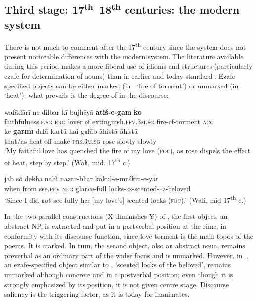 \documentclass[output=paper]{LSP/langsci}
\begin{document}
\subsection{Third stage: 17\textsuperscript{th}–18\textsuperscript{th} centuries: the modern system}
\label{10-mo-sec:4.3}

There is not much to comment after the 17\textsuperscript{th} century since the system does not present noticeable differences with the modern system. The literature available during this period makes a more liberal use of  idioms and structures (particularly ezafe for determination of nouns) than in earlier  and today standard . Ezafe specified objects can be either marked (in~ ‘fire of torment’) or unmarked (in~ ‘heat’): what prevails is the degree of  in the discourse:

\ea\label{10-mo-ex:42}
\ea \label{10-mo-ex:42a}
\gll wafādārī ne dilbar kī bujhāyā \textbf{ātiś-e-gam} \textbf{ko}\\
 faithfulness.\textsc{f.sg} \textsc{erg} lover of extinguish.\textsc{pfv.3m.sg} fire-of-torment \textsc{acc}\\
 \ex \label{10-mo-ex:42b}
 \gll ke \textbf{garmī} dafā kartā hai gulāb āhistā āhistā\\
 that/as heat off make \textsc{prs.3m.sg} rose slowly slowly\\
\glt ‘My faithful love has quenched the fire of my love (\textsc{foc}), as rose dispels the effect of heat, step by step.’ (Wali, mid. 17\textsuperscript{th} c.)
\z
\z

\ea
\label{10-mo-ex:43}
\gll  jab sõ dekhā nahī̃ nazar-bhar kākul-e-muśkin-e-yār\\
 when from see.\textsc{pfv} \textsc{neg} glance-full locks-\textsc{ez}-scented-\textsc{ez}-beloved\\
\glt ‘Since I did not see fully her [my love’s] scented locks (\textsc{foc}).’ (Wali, mid 17\textsuperscript{th} c.)
\z

In the two parallel constructions (X diminishes Y) of , the first object, an abstract NP, is extracted and put in a postverbal position at the rime, in conformity with its discourse function, since love torment is the main topos of the poems. It is marked. In turn, the second object, also an abstract noun, remains preverbal as an ordinary part of the wider focus and is unmarked. However, in~, an ezafe-specified object similar to , ‘scented locks of the beloved’, remains unmarked although concrete and in a postverbal position; even though it is strongly emphasized by its position, it is not given centre stage. Discourse saliency is the triggering factor, as it is today for inanimates.
\end{document}
